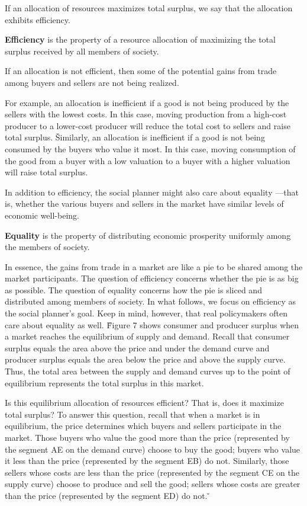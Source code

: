 If an allocation of resources maximizes total surplus, we say that the allocation exhibits efficiency.

\bd[Efficiency]
\textbf{Efficiency} is the property of a resource allocation of maximizing the total surplus received by all members of
society.
\ed

If an allocation is not efficient, then some of the potential gains from trade among buyers and sellers are not being
realized.

\be
For example, an allocation is inefficient if a good is not being produced by the sellers with the lowest costs. In this
case, moving production from a high-cost producer to a lower-cost producer will reduce the total cost to sellers and
raise total surplus. \v

Similarly, an allocation is inefficient if a good is not being consumed by the buyers who value it most. In this case,
moving consumption of the good from a buyer with a low valuation to a buyer with a higher valuation will raise total
surplus.
\ee

In addition to efficiency, the social planner might also care about equality —that is, whether the various buyers and
sellers in the market have similar levels of economic well-being.

\bd[Equality]
\textbf{Equality} is the property of distributing economic prosperity uniformly among the members of society.
\ed

In essence, the gains from trade in a market are like a pie to be shared among the market participants. The question
of efficiency concerns whether the pie is as big as possible. The question of equality concerns how the pie is sliced
and distributed among members of society. In what follows, we focus on efficiency as the social planner's goal. Keep
in mind, however, that real policymakers often care about equality as well. \v

Figure 7 shows consumer and producer surplus when a market reaches the equilibrium of supply and demand. Recall that
consumer surplus equals the area above the price and under the demand curve and producer surplus equals the area
below the price and above the supply curve. Thus, the total area between the supply and demand curves up to the point
of equilibrium represents the total surplus in this market.


Is this equilibrium allocation of resources efficient? That is, does it maximize total surplus? To answer this
question, recall that when a market is in equilibrium, the price determines which buyers and sellers participate in
the market. Those buyers who value the good more than the price (represented by the segment AE on the demand curve)
choose to buy the good; buyers who value it less than the price (represented by the segment EB) do not. Similarly,
those sellers whose costs are less than the price (represented by the segment CE on the supply curve) choose to
produce and sell the good; sellers whose costs are greater than the price (represented by the segment ED) do not. \v

